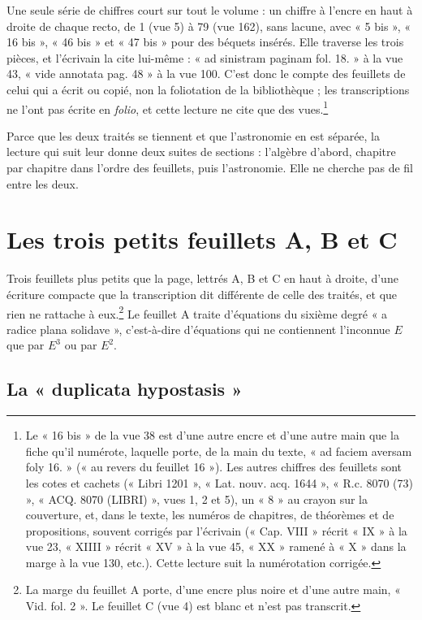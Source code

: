 \documentclass[11pt,a4paper]{article}
\begin{document}
Une seule série de chiffres court sur tout le volume : un chiffre à l'encre en
haut à droite de chaque recto, de 1 (vue 5) à 79 (vue 162), sans lacune, avec
« 5 bis », « 16 bis », « 46 bis » et « 47 bis » pour des béquets insérés. Elle
traverse les trois pièces, et l'écrivain la cite lui-même : « ad sinistram
paginam fol. 18. » à la vue 43, « vide annotata pag. 48 » à la vue 100. C'est
donc le compte des feuillets de celui qui a écrit ou copié, non la foliotation
de la bibliothèque ; les transcriptions ne l'ont pas écrite en \emph{folio}, et
cette lecture ne cite que des vues.\footnote{Le « 16 bis » de la vue 38 est
d'une autre encre et d'une autre main que la fiche qu'il numérote, laquelle
porte, de la main du texte, « ad faciem aversam foly 16. » (« au revers du
feuillet 16 »). Les autres chiffres des feuillets sont les cotes et cachets
(« Libri 1201 », « Lat. nouv. acq. 1644 », « R.c. 8070 (73) », « ACQ. 8070
(LIBRI) », vues 1, 2 et 5), un « 8 » au crayon sur la couverture, et, dans le
texte, les numéros de chapitres, de théorèmes et de propositions, souvent
corrigés par l'écrivain (« Cap. VIII » récrit « IX » à la vue 23, « XIIII »
récrit « XV » à la vue 45, « XX » ramené à « X » dans la marge à la vue 130,
etc.). Cette lecture suit la numérotation corrigée.}

Parce que les deux traités se tiennent et que l'astronomie en est séparée, la
lecture qui suit leur donne deux suites de sections : l'algèbre d'abord,
chapitre par chapitre dans l'ordre des feuillets, puis l'astronomie. Elle ne
cherche pas de fil entre les deux.

\section*{Les trois petits feuillets A, B et C}

Trois feuillets plus petits que la page, lettrés A, B et C en haut à droite,
d'une écriture compacte que la transcription dit différente de celle des
traités, et que rien ne rattache à eux.\footnote{La marge du feuillet A porte,
d'une encre plus noire et d'une autre main, « Vid. fol. 2 ». Le feuillet C
(vue 4) est blanc et n'est pas transcrit.} Le feuillet A traite d'équations du
sixième degré « a radice plana solidave », c'est-à-dire d'équations qui ne
contiennent l'inconnue $E$ que par $E^3$ ou par $E^2$.

\subsection*{La « duplicata hypostasis »}
\end{document}
